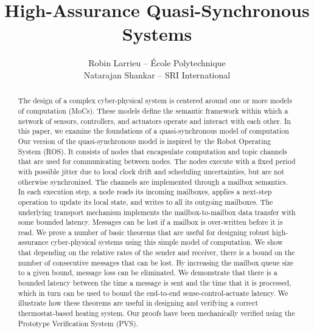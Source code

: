 \documentclass[12pt,a4paper]{article}
\title{High-Assurance Quasi-Synchronous Systems}
\date{}
\author{Robin Larrieu -- \'Ecole Polytechnique \\ Natarajan Shankar -- SRI International}
\begin{document}
\maketitle

\begin{abstract}
The design of a complex cyber-physical system is centered around one
or more models of computation (MoCs).  These models define the
semantic framework within which a network of sensors, controllers, and
actuators operate and interact with each other.  In this paper, we
examine the foundations of a quasi-synchronous model of computation
Our version of the quasi-synchronous model is inspired by the Robot
Operating System (ROS).  It consists of nodes that encapsulate
computation and topic channels that are used for communicating between
nodes.  The nodes execute with a fixed period with possible jitter due
to local clock drift and scheduling uncertainties, but are not
otherwise synchronized.  The channels are implemented through a
mailbox semantics.  In each execution step, a node reads its incoming
mailboxes, applies a next-step operation to update its local state,
and writes to all its outgoing mailboxes.  The underlying transport
mechanism implements the mailbox-to-mailbox data transfer with some
bounded latency.  Messages can be lost if a mailbox is over-written
before it is read.  We prove a number of basic theorems that are
useful for designing robust high-assurance cyber-physical systems
using this simple model of computation.  We show that depending on the
relative rates of the sender and receiver, there is a bound on the
number of consecutive messages that can be lost.  By increasing the
mailbox queue size to a given bound, message loss can be eliminated.
We demonstrate that there is a bounded latency between the time a
message is sent and the time that it is processed, which in turn can
be used to bound the end-to-end sense-control-actuate latency.  We
illustrate how these theorems are useful in designing and verifying a
correct thermostat-based heating system.  Our proofs have been
mechanically verified using the Prototype Verification System (PVS). 
\end{abstract}
\newpage
 
\tableofcontents

\restoregeometry %
\newpage
\end{document}
